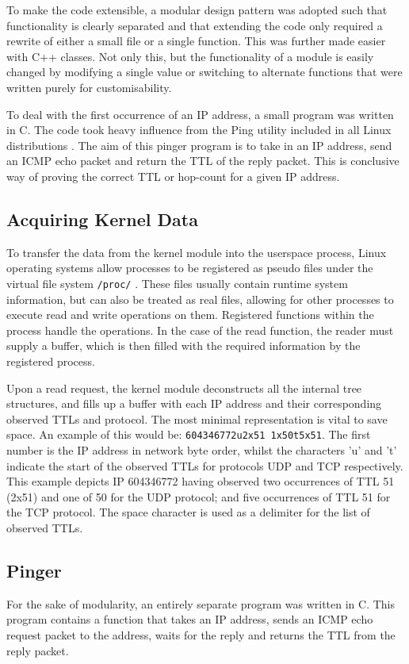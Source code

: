 \documentclass[12pt,twoside]{article}
\begin{document}
To make the code extensible, a modular design pattern was adopted such that functionality is clearly separated and that extending the code only required a rewrite of either a small file or a single function. This was further made easier with C++ classes. Not only this, but the functionality of a module is easily changed by modifying a single value or switching to alternate functions that were written purely for customisability.

To deal with the first occurrence of an IP address, a small program was written in C. The code took heavy influence from the Ping utility included in all Linux distributions \cite{pingc}. The aim of this pinger program is to take in an IP address, send an ICMP echo packet and return the TTL of the reply packet. This is conclusive way of proving the correct TTL or hop-count for a given IP address.  

\subsection{Acquiring Kernel Data}
To transfer the data from the kernel module into the userspace process, Linux operating systems allow processes to be registered as pseudo files under the virtual file system \texttt{/proc/} \cite{proc}. These files usually contain runtime system information, but can also be treated as real files, allowing for other processes to execute read and write operations on them. Registered functions within the process handle the operations. In the case of the read function, the reader must supply a buffer, which is then filled with the required information by the registered process.

Upon a read request, the kernel module deconstructs all the internal tree structures, and fills up a buffer with each IP address and their corresponding observed TTLs and protocol. The most minimal representation is vital to save space. An example of this would be: \texttt{604346772u2x51 1x50t5x51}. The first number is the IP address in network byte order, whilst the characters 'u' and 't' indicate the start of the observed TTLs for protocols UDP and TCP respectively. This example depicts IP 604346772 having observed two occurrences of TTL 51 (2x51) and one of 50 for the UDP protocol; and five occurrences of TTL 51 for the TCP protocol. The space character is used as a delimiter for the list of observed TTLs.

\subsection{Pinger}
For the sake of modularity, an entirely separate program was written in C. This program contains a function that takes an IP address, sends an ICMP echo request packet to the address, waits for the reply and returns the TTL from the reply packet. 
\end{document}
